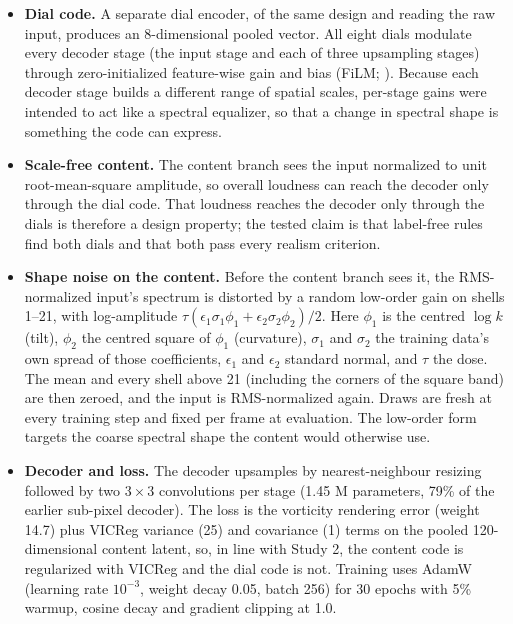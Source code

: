 \documentclass[10pt]{article}
\begin{document}
\begin{itemize}
\item \textbf{Dial code.} A separate dial encoder, of the same design and reading the raw input, produces an 8-dimensional pooled vector. All eight dials modulate every decoder stage (the input stage and each of three upsampling stages) through zero-initialized feature-wise gain and bias (FiLM; \citealp{perez2018film}). Because each decoder stage builds a different range of spatial scales, per-stage gains were intended to act like a spectral equalizer, so that a change in spectral shape is something the code can express.
\item \textbf{Scale-free content.} The content branch sees the input normalized to unit root-mean-square amplitude, so overall loudness can reach the decoder only through the dial code. That loudness reaches the decoder only through the dials is therefore a design property; the tested claim is that label-free rules find both dials and that both pass every realism criterion.
\item \textbf{Shape noise on the content.} Before the content branch sees it, the RMS-normalized input's spectrum is distorted by a random low-order gain on shells 1--21, with log-amplitude $\tau(\epsilon_1\sigma_1\phi_1 + \epsilon_2\sigma_2\phi_2)/2$. Here $\phi_1$ is the centred $\log k$ (tilt), $\phi_2$ the centred square of $\phi_1$ (curvature), $\sigma_1$ and $\sigma_2$ the training data's own spread of those coefficients, $\epsilon_1$ and $\epsilon_2$ standard normal, and $\tau$ the dose. The mean and every shell above 21 (including the corners of the square band) are then zeroed, and the input is RMS-normalized again. Draws are fresh at every training step and fixed per frame at evaluation. The low-order form targets the coarse spectral shape the content would otherwise use.
\item \textbf{Decoder and loss.} The decoder upsamples by nearest-neighbour resizing followed by two $3 \times 3$ convolutions per stage (1.45 M parameters, 79\% of the earlier sub-pixel decoder). The loss is the vorticity rendering error (weight 14.7) plus VICReg variance (25) and covariance (1) terms on the pooled 120-dimensional content latent, so, in line with Study 2, the content code is regularized with VICReg and the dial code is not. Training uses AdamW (learning rate $10^{-3}$, weight decay 0.05, batch 256) for 30 epochs with 5\% warmup, cosine decay and gradient clipping at 1.0.
\end{itemize}
\end{document}
